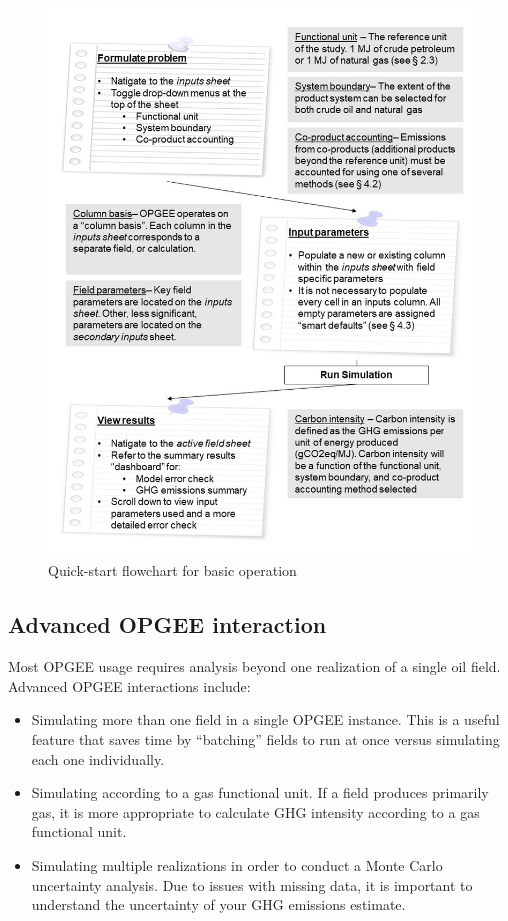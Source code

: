 \documentclass[11pt]{report}
\begin{document}
\begin{figure}[t]
\includegraphics[width=1\columnwidth]{documentation/images/User_Guide_figs/basic.jpg}
\caption{Quick-start flowchart for basic operation}
\label{fig:basic_flow}
\end{figure}

\clearpage

\subsection{Advanced OPGEE interaction} 

Most OPGEE usage requires analysis beyond one realization of a single oil field. Advanced OPGEE interactions include:

\begin{itemize}
\item Simulating more than one field in a single OPGEE instance. This is a useful feature that saves time by ``batching'' fields to run at once versus simulating each one individually.
\item Simulating according to a gas functional unit. If a field produces primarily gas, it is more appropriate to calculate GHG intensity according to a gas functional unit.
\item Simulating multiple realizations in order to conduct a Monte Carlo uncertainty analysis. Due to issues with missing data, it is important to understand the uncertainty of your GHG emissions estimate.
\end{itemize}
\end{document}
